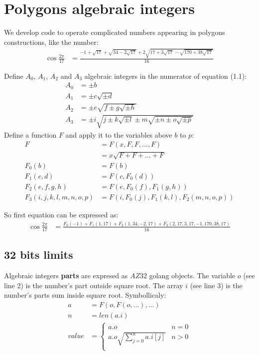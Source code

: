 \documentclass{article}
\begin{document}
\section{Polygons algebraic integers}
We develop code to operate complicated numbers appearing in polygons constructions, like the number:
\begin{align}
\cos{\frac{2\pi}{17}} &=
\frac{-1+\sqrt{17}+\sqrt{34-2\sqrt{17}}+2\sqrt{17+3\sqrt{17}-\sqrt{170+38\sqrt{17}}}}{16}
\end{align}

Define $A_0$, $A_1$, $A_2$ and $A_3$ algebraic integers in the numerator of equation (1.1):
\begin{align}
A_0 &= \pm b\\
A_1 &= \pm c\sqrt{\pm d}\\
A_2 &= \pm e\sqrt{f \pm g\sqrt{\pm h}}\\
A_3 &= \pm i\sqrt{j \pm k\sqrt{\pm l} \pm m\sqrt{\pm n \pm o\sqrt{\pm p}}}
\end{align}
Define a function $F$ and apply it to the variables above $b$ to $p$:
\begin{align}
 F &= F(x,F,F,...,F)\\
   &= x\sqrt{F + F + ... + F}\\
 F_0(b) &= F(b)\\
 F_1(c,d) &= F(c,F_0(d))\\
 F_2(e,f,g,h) &= F(e,F_0(f),F_1(g,h))\\
 F_3(i,j,k,l,m,n,o,p) &= F(i,F_0(j),F_1(k,l),F_2(m,n,o,p))
\end{align}

So first equation can be expressed as:
\begin{align}
\cos{\frac{2\pi}{17}} &=
\frac{F_0(-1) + F_1(1,17) + F_2(1,34,-2,17) + F_3(2,17,3,17,-1,170,38,17)}{16}
\end{align}



\subsection{32 bits limits}

Algebraic integers \textbf{parts} are expresed as $AZ32$ golang objects.
The variable $o$ (see line 2) is the number's part outside square root.
The array $i$ (see line 3) is the number's parts sum inside square root.
Symbollicaly:
\begin{align}
a &= F(o,F(o,...),...)\\
n &= len(a.i)\\
value &= \begin{cases}
 a.o                               &n = 0\\
 a.o\sqrt{ \sum_{j=0}^{n} a.i[j] } &n > 0\\
\end{cases}
\end{align}
\end{document}
